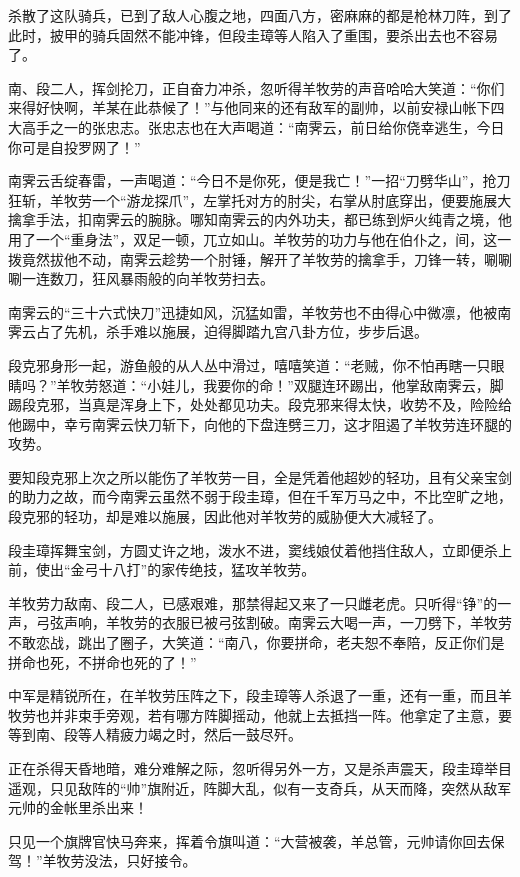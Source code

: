 \documentclass[12pt,oneside]{book}
\begin{document}
杀散了这队骑兵，已到了敌人心腹之地，四面八方，密麻麻的都是枪林刀阵，到了此时，披甲的骑兵固然不能冲锋，但段圭璋等人陷入了重围，要杀出去也不容易了。

南、段二人，挥剑抡刀，正自奋力冲杀，忽听得羊牧劳的声音哈哈大笑道：``你们来得好快啊，羊某在此恭候了！''与他同来的还有敌军的副帅，以前安禄山帐下四大高手之一的张忠志。张忠志也在大声喝道：``南霁云，前日给你侥幸逃生，今日你可是自投罗网了！''

南霁云舌绽春雷，一声喝道：``今日不是你死，便是我亡！''一招``刀劈华山''，抢刀狂斩，羊牧劳一个``游龙探爪''，左掌托对方的肘尖，右掌从肘底穿出，便要施展大擒拿手法，扣南霁云的腕脉。哪知南霁云的内外功夫，都已练到炉火纯青之境，他用了一个``重身法''，双足一顿，兀立如山。羊牧劳的功力与他在伯仆之，间，这一拨竟然拔他不动，南霁云趁势一个肘锤，解开了羊牧劳的擒拿手，刀锋一转，唰唰唰一连数刀，狂风暴雨般的向羊牧劳扫去。

南霁云的``三十六式快刀''迅捷如风，沉猛如雷，羊牧劳也不由得心中微凛，他被南霁云占了先机，杀手难以施展，迫得脚踏九宫八卦方位，步步后退。

段克邪身形一起，游鱼般的从人丛中滑过，嘻嘻笑道：``老贼，你不怕再瞎一只眼睛吗？''羊牧劳怒道：``小娃儿，我要你的命！''双腿连环踢出，他掌敌南霁云，脚踢段克邪，当真是浑身上下，处处都见功夫。段克邪来得太快，收势不及，险险给他踢中，幸亏南霁云快刀斩下，向他的下盘连劈三刀，这才阻遏了羊牧劳连环腿的攻势。

要知段克邪上次之所以能伤了羊牧劳一目，全是凭着他超妙的轻功，且有父亲宝剑的助力之故，而今南霁云虽然不弱于段圭璋，但在千军万马之中，不比空旷之地，段克邪的轻功，却是难以施展，因此他对羊牧劳的威胁便大大减轻了。

段圭璋挥舞宝剑，方圆丈许之地，泼水不进，窦线娘仗着他挡住敌人，立即便杀上前，使出``金弓十八打''的家传绝技，猛攻羊牧劳。

羊牧劳力敌南、段二人，已感艰难，那禁得起又来了一只雌老虎。只听得``铮''的一声，弓弦声响，羊牧劳的衣服已被弓弦割破。南霁云大喝一声，一刀劈下，羊牧劳不敢恋战，跳出了圈子，大笑道：``南八，你要拼命，老夫恕不奉陪，反正你们是拼命也死，不拼命也死的了！''

中军是精锐所在，在羊牧劳压阵之下，段圭璋等人杀退了一重，还有一重，而且羊牧劳也并非束手旁观，若有哪方阵脚摇动，他就上去抵挡一阵。他拿定了主意，要等到南、段等人精疲力竭之时，然后一鼓尽歼。

正在杀得天昏地暗，难分难解之际，忽听得另外一方，又是杀声震天，段圭璋举目遥观，只见敌阵的``帅''旗附近，阵脚大乱，似有一支奇兵，从天而降，突然从敌军元帅的金帐里杀出来！

只见一个旗牌官快马奔来，挥着令旗叫道：``大营被袭，羊总管，元帅请你回去保驾！''羊牧劳没法，只好接令。
\end{document}
